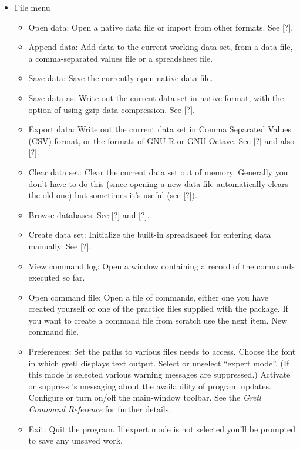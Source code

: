 \begin{itemize}
\item \textsf{File menu}
  \begin{itemize}
  \item \textsf{Open data}: Open a native  data file or
    import from other formats.  See [?].
  \item \textsf{Append data}: Add data to the current working data
    set, from a  data file, a comma-separated values file
    or a spreadsheet file.
  \item \textsf{Save data}: Save the currently open native 
    data file.
  \item \textsf{Save data as}: Write out the current data set in
    native format, with the option of using gzip data compression. See
    [?].
	    
  \item \textsf{Export data}: Write out the current data set in Comma
    Separated Values (CSV) format, or the formats of GNU R or GNU
    Octave. See [?] and also [?].
  \item \textsf{Clear data set}: Clear the current data set out of
    memory.  Generally you don't have to do this (since opening a new
    data file automatically clears the old one) but sometimes it's
    useful (see [?]).
  \item \textsf{Browse databases}: See [?] and [?].
  \item \textsf{Create data set}: Initialize the built-in spreadsheet
    for entering data manually.  See [?].
  \item \textsf{View command log}: Open a window containing a record
    of the commands executed so far.
  \item \textsf{Open command file}: Open a file of 
    commands, either one you have created yourself or one of the
    practice files supplied with the package.  If you want to create a
    command file from scratch use the next item, \textsf{New command
      file}.
  \item \textsf{Preferences}: Set the paths to various files
     needs to access. Choose the font in which gretl
    displays text output.  Select or unselect ``expert mode''. (If
    this mode is selected various warning messages are suppressed.)
    Activate or suppress 's messaging about the
    availability of program updates.  Configure or turn on/off the
    main-window toolbar. See the \emph{Gretl Command Reference} for
    further details.
  \item \textsf{Exit}: Quit the program. If expert mode is not
    selected you'll be prompted to save any unsaved work.
  \end{itemize}



\end{itemize}
